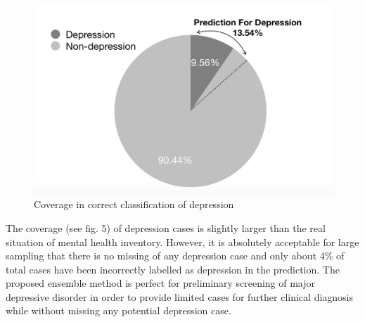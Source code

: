 \documentclass[10pt,journal,compsoc]{IEEEtran}
\begin{document}
\begin{figure}[h]
\includegraphics[width=1\textwidth]{coverage.png}
\caption{Coverage in correct classification of depression} \label{fig5}
\end{figure}
The coverage (see fig. 5) of depression cases is slightly larger than the real situation of mental health inventory. However, it is absolutely acceptable for large sampling that there is no missing of any depression case and only about 4\% of total cases have been incorrectly labelled as depression in the prediction. The proposed ensemble method is perfect for preliminary screening of major depressive disorder in order to provide limited cases for further clinical diagnosis while without missing any potential depression case. 
\end{document}
